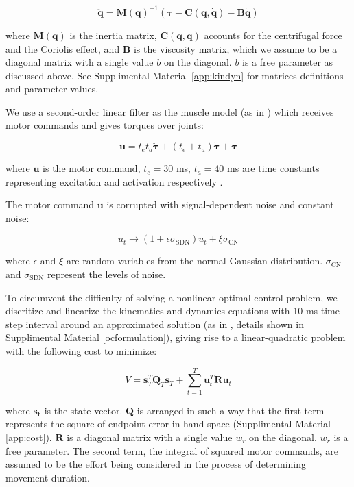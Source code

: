 \begin{equation} \label{maindynamics}
	\ddot{\bm{q}} = \bm{M}(\bm{q})^{-1} (\bm{\tau} - \bm{C}(\bm{q}, \dot{\bm{q}}) - \bm{B}\dot{\bm{q}})
\end{equation}

where $\bm{M}(\bm{q})$ is the inertia matrix, $\bm{C}(\bm{q}, \dot{\bm{q}})$ accounts for the centrifugal force and the Coriolis effect, and $\bm{B}$ is the viscosity matrix, which we assume to be a diagonal matrix with a single value $b$ on the diagonal. $b$ is a free parameter as discussed above. 
See Supplimental Material \ref{app:kindyn} for matrices definitions and parameter values.

We use a second-order linear filter as the muscle model (as in \cite{VanBeers2004}) which receives motor commands and gives torques over joints:

\begin{equation}
	\bm{u} = t_et_a\ddot{\bm{\tau}} + (t_e+t_a)\dot{\bm{\tau}} +\bm{\tau}
\end{equation}

where $\bm{u}$ is the motor command, $t_e = 30$ ms, $t_a = 40$ ms are time constants representing excitation and activation respectively \cite{VanDerHelm}. 

The motor command $\bm{u}$ is corrupted with signal-dependent noise and constant noise:

\begin{equation}\label{cnsdn}
u_t \rightarrow (1 + \epsilon\sigma_{\text{SDN}}) u_t + \xi\sigma_{\text{CN}}
\end{equation}

where $\epsilon$ and $\xi$ are random variables from the normal Gaussian distribution.
$\sigma_{\text{CN}}$ and $\sigma_{\text{SDN}}$ represent the levels of noise.

To circumvent the difficulty of solving a nonlinear optimal control problem, we discritize and linearize the kinematics and dynamics equations with 10 ms time step interval around an approximated solution (as in \cite{Li2004}, details shown in Supplimental Material \ref{ocformulation}), giving rise to a linear-quadratic problem with the following cost to minimize:

\begin{equation}
V = \bm{s}_T^T\bm{Q}_T\bm{s}_T + \sum_{t=1}^T\bm{u}_t^T\bm{Ru}_t
\end{equation}

where $\bm{s_t}$ is the state vector. 
$\bm{Q}$ is arranged in such a way that the first term represents the square of endpoint error in hand space (Supplimental Material \ref{app:cost}). 
$\bm{R}$ is a diagonal matrix with a single value $w_r$ on the diagonal.
$w_r$ is a free parameter.
The second term, the integral of squared motor commands, are assumed to be the effort being considered in the process of determining movement duration. 

